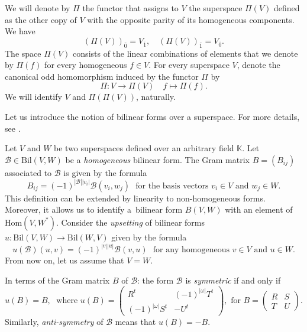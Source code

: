\documentclass[12pt]{amsart}
\begin{document}
We will denote by $\Pi$ the functor that assigns to $V$ the superspace $\Pi(V)$ defined as the other copy of $V$ with the opposite parity of its homogeneous components. We have 
\[
(\Pi(V))_{\bar 0} = V_{\bar 1}, \quad  (\Pi(V))_{\bar 1} = V_{\bar 0}.
\]
The space $\Pi(V)$ consists of the linear combinations of elements that we denote by $\Pi(f)$ for every homogeneous $f\in V$.  For every superspace $V$,  denote the canonical odd homomorphism induced by the functor $\Pi$ by 
\[
\Pi: V \rightarrow \Pi(V) \quad f \mapsto \Pi(f).
\] 
We will identify $V$ and $\Pi(\Pi(V))$, naturally.

Let us introduce the notion of bilinear forms over a superspace. For more details, see \cite{LSoS}. 

Let $V$ and $W$ be two superspaces defined over an arbitrary field ${\mathbb K}$. Let $\mathcal{B} \in \text{Bil}(V,W)$ be a {\it homogeneous} bilinear form. The Gram matrix $B=(B_{ij})$ associated to ${\mathcal B}$ is given by the formula 
\begin{equation*}\label{martBil}
B_{ij}=(-1)^{|{\mathcal B}||v_i|}{\mathcal B} (v_{i}, w_{j})\text{~~for the basis vectors $v_{i}\in V$ and $w_{j}\in W$.}
\end{equation*}
This definition can be extended by linearity to non-homogeneous forms.  Moreover,  it allows us to identify a~bilinear form $B(V, W)$ with an element of $\mathrm{Hom}(V, W^*)$. 
Consider the \textit{upsetting} of bilinear forms
$u\colon\mathrm{Bil} (V, W)\rightarrow \mathrm{Bil}(W, V)$ given by the formula \begin{equation*}
\label{susyB}
u(\mathcal{B})(u, v)=(-1)^{|v||u|}\mathcal{B} (v,u)\text{~~for any homogeneous $v \in V$ and $u\in W$.}
\end{equation*}
From now on, let us assume that $V=W$. 

In terms of the Gram matrix $B$ of ${\mathcal B} $: the form
${\mathcal B}$ is  \textit{symmetric} if  and only if 
\begin{equation*}\label{BilSy}
u(B)=B,\;\text{ where $u(B)=
\left( \begin{array}{cc} R^{t} & (-1)^{|\omega |}T^{t}\\[2mm]
(-1)^{|\omega |}S^{t} & -U^{t}\end{array}\right ),$ for $B= \left (\begin{array}{cc} R & S\\[2mm]
T & U
\end{array} \right)$.}
\end{equation*}
Similarly, \textit{anti-symmetry} of ${\mathcal B}$ means that $u(B)=-B$.
\end{document}
